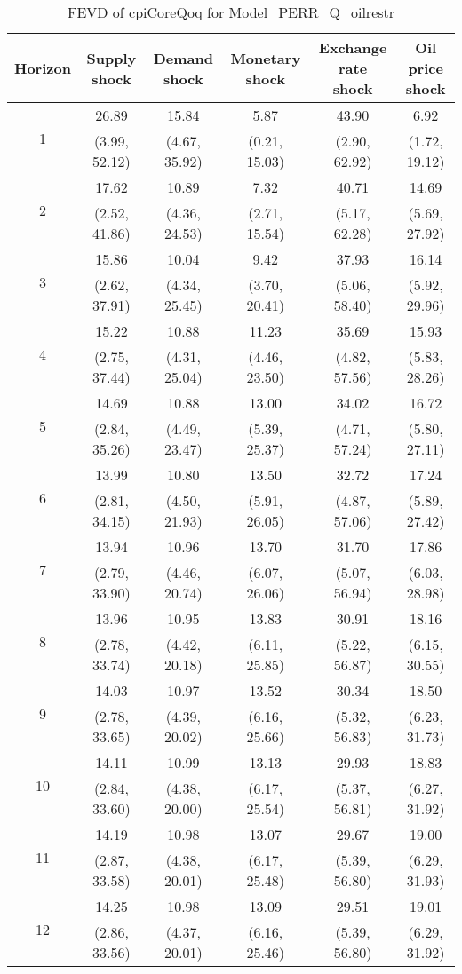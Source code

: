\documentclass{article}
\begin{document}
\begin{table}
	\footnotesize
	\caption{FEVD of cpiCoreQoq for Model_PERR_Q_oilrestr}
	\begin{tabular}{cccccc}
		Horizon & Supply shock & Demand shock & Monetary shock & Exchange rate shock & Oil price shock\\ \hline
		\multirow{2}{*}{1} & 26.89 & 15.84 & 5.87 & 43.90 & 6.92\\
		 & (3.99, 52.12) & (4.67, 35.92) & (0.21, 15.03) & (2.90, 62.92) & (1.72, 19.12)\\
		\multirow{2}{*}{2} & 17.62 & 10.89 & 7.32 & 40.71 & 14.69\\
		 & (2.52, 41.86) & (4.36, 24.53) & (2.71, 15.54) & (5.17, 62.28) & (5.69, 27.92)\\
		\multirow{2}{*}{3} & 15.86 & 10.04 & 9.42 & 37.93 & 16.14\\
		 & (2.62, 37.91) & (4.34, 25.45) & (3.70, 20.41) & (5.06, 58.40) & (5.92, 29.96)\\
		\multirow{2}{*}{4} & 15.22 & 10.88 & 11.23 & 35.69 & 15.93\\
		 & (2.75, 37.44) & (4.31, 25.04) & (4.46, 23.50) & (4.82, 57.56) & (5.83, 28.26)\\
		\multirow{2}{*}{5} & 14.69 & 10.88 & 13.00 & 34.02 & 16.72\\
		 & (2.84, 35.26) & (4.49, 23.47) & (5.39, 25.37) & (4.71, 57.24) & (5.80, 27.11)\\
		\multirow{2}{*}{6} & 13.99 & 10.80 & 13.50 & 32.72 & 17.24\\
		 & (2.81, 34.15) & (4.50, 21.93) & (5.91, 26.05) & (4.87, 57.06) & (5.89, 27.42)\\
		\multirow{2}{*}{7} & 13.94 & 10.96 & 13.70 & 31.70 & 17.86\\
		 & (2.79, 33.90) & (4.46, 20.74) & (6.07, 26.06) & (5.07, 56.94) & (6.03, 28.98)\\
		\multirow{2}{*}{8} & 13.96 & 10.95 & 13.83 & 30.91 & 18.16\\
		 & (2.78, 33.74) & (4.42, 20.18) & (6.11, 25.85) & (5.22, 56.87) & (6.15, 30.55)\\
		\multirow{2}{*}{9} & 14.03 & 10.97 & 13.52 & 30.34 & 18.50\\
		 & (2.78, 33.65) & (4.39, 20.02) & (6.16, 25.66) & (5.32, 56.83) & (6.23, 31.73)\\
		\multirow{2}{*}{10} & 14.11 & 10.99 & 13.13 & 29.93 & 18.83\\
		 & (2.84, 33.60) & (4.38, 20.00) & (6.17, 25.54) & (5.37, 56.81) & (6.27, 31.92)\\
		\multirow{2}{*}{11} & 14.19 & 10.98 & 13.07 & 29.67 & 19.00\\
		 & (2.87, 33.58) & (4.38, 20.01) & (6.17, 25.48) & (5.39, 56.80) & (6.29, 31.93)\\
		\multirow{2}{*}{12} & 14.25 & 10.98 & 13.09 & 29.51 & 19.01\\
		 & (2.86, 33.56) & (4.37, 20.01) & (6.16, 25.46) & (5.39, 56.80) & (6.29, 31.92)\\
	\end{tabular}
\label{tab:fevd-Model_PERR_Q_oilrestr-cpiCoreQoq}
\end{table}
\end{document}
